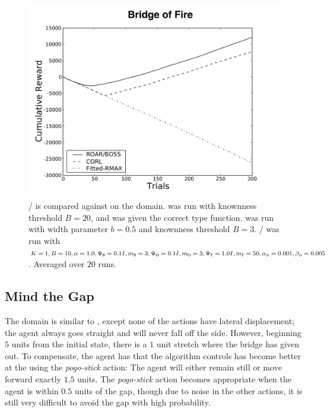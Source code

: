 \begin{figure}[t]
\vskip 0.2in
\begin{center}
\centerline{\includegraphics[width=\columnwidth]{figures/bridgeFigure}}
\caption{/ is compared against  on the  domain.  was run with knownness threshold $B=20$, and was given the correct type function.  was run with width parameter $b=0.5$ and knownness threshold $B=3$. / was run with $K=1, B=10, \alpha=1.0,\Psi_{\mbox s}=0.1I, m_{\mbox s}=3, \Psi_{\mbox o}=0.1I, m_{\mbox o}=3, \Psi_{\mbox r}=1.0I,m_{\mbox r}=50,\alpha_\phi=0.001,\beta_\phi=0.005$. Averaged over $20$ runs.}
\label{fig:bridge}
\end{center}
\vskip -0.2in
\end{figure} 

\subsection{Mind the Gap}
\label{gap}

The  domain is similar to , except none of the actions have lateral displacement; the agent always goes straight and will never fall off the side. However, beginning $5$ units from the initial state, there is a $1$ unit stretch where the bridge has given out. To compensate, the agent has that the algorithm controls has become better at the using the \emph{pogo-stick} action: The agent will either remain still or move forward exactly $1.5$ units. The \emph{pogo-stick} action becomes appropriate when the agent is within $0.5$ units of the gap, though due to noise in the other actions, it is still very difficult to avoid the gap with high probability.


